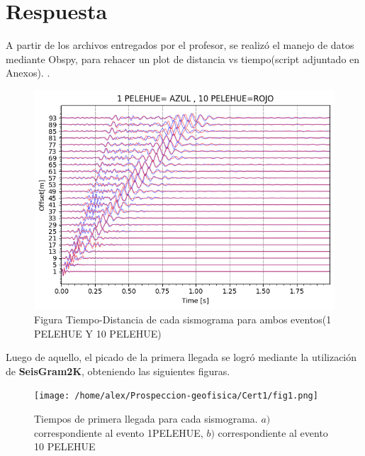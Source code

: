 \documentclass{article}
\theoremstyle{mytheoremstyle}
\theoremstyle{mytheoremstyle}
\theoremstyle{myproblemstyle}
\begin{document}
	\section*{Respuesta}
	A partir de los archivos entregados por el profesor, se realizó el manejo de datos mediante Obspy, para rehacer un plot de distancia vs tiempo(script adjuntado en Anexos).
	.\par
	\begin{figure}[h]
		\includegraphics[width=\textwidth]{ambos.png}
		\caption[]{Figura Tiempo-Distancia de cada sismograma para ambos eventos(1 PELEHUE Y 10 PELEHUE)}
	\end{figure}
	Luego de aquello, el picado de la primera llegada se logró mediante la utilización de \textbf{SeisGram2K}, obteniendo las siguientes figuras.
	\begin{figure}[h]
		\texttt{[image: /home/alex/Prospeccion-geofisica/Cert1/fig1.png]}
		\caption{Tiempos de primera llegada para cada sismograma. $a)$ correspondiente al evento 1PELEHUE, $b)$ correspondiente al evento 10 PELEHUE}
	\end{figure}
\end{document}
